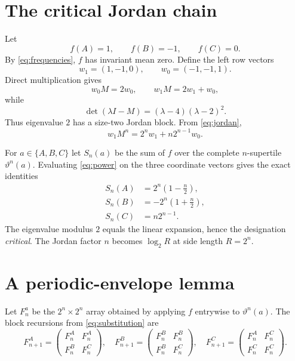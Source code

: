 \documentclass[11pt,a4paper]{amsart}
\theoremstyle{definition}
\theoremstyle{remark}
\begin{document}
\section{The critical Jordan chain}

Let
\[
 f(A)=1,\qquad f(B)=-1,\qquad f(C)=0.
\]
By \eqref{eq:frequencies}, $f$ has invariant mean zero.  Define the left row
vectors
\[
 w_1=(1,-1,0),\qquad w_0=(-1,-1,1).
\]
Direct multiplication gives
\begin{equation}\label{eq:jordan}
 w_0M=2w_0,\qquad w_1M=2w_1+w_0,
\end{equation}
while
\[
 \det(\lambda I-M)=(\lambda-4)(\lambda-2)^2.
\]
Thus eigenvalue $2$ has a size-two Jordan block.  From
\eqref{eq:jordan},
\begin{equation}\label{eq:power}
 w_1M^n=2^nw_1+n2^{n-1}w_0.
\end{equation}

For $a\in\{A,B,C\}$ let $S_n(a)$ be the sum of $f$ over the complete
$n$-supertile $\vartheta^n(a)$.  Evaluating \eqref{eq:power} on the three
coordinate vectors gives the exact identities
\begin{equation}\label{eq:supertile-sums}
\begin{aligned}
 S_n(A)&=2^n\left(1-\frac n2\right),\\
 S_n(B)&=-2^n\left(1+\frac n2\right),\\
 S_n(C)&=n2^{n-1}.
\end{aligned}
\end{equation}
The eigenvalue modulus $2$ equals the linear expansion, hence the designation
\emph{critical}.  The Jordan factor $n$ becomes $\log_2R$ at side length
$R=2^n$.

\section{A periodic-envelope lemma}

Let $F_n^a$ be the $2^n\times2^n$ array obtained by applying $f$ entrywise
to $\vartheta^n(a)$.  The block recursions from \eqref{eq:substitution} are
\[
 F_{n+1}^A=\begin{pmatrix}F_n^A&F_n^A\\F_n^B&F_n^C\end{pmatrix},\quad
 F_{n+1}^B=\begin{pmatrix}F_n^B&F_n^B\\F_n^B&F_n^C\end{pmatrix},\quad
 F_{n+1}^C=\begin{pmatrix}F_n^A&F_n^C\\F_n^C&F_n^C\end{pmatrix}.
\]
\end{document}
